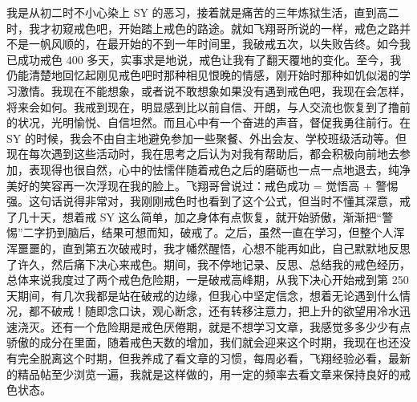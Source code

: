 \begin{case}
    我是从初二时不小心染上 SY 的恶习，接着就是痛苦的三年炼狱生活，直到高二时，我才初窥戒色吧，开始踏上戒色的路途。就如飞翔哥所说的一样，戒色之路并不是一帆风顺的，在最开始的不到一年时间里，我破戒五次，以失败告终。如今我已成功戒色 400 多天，实事求是地说，戒色让我有了翻天覆地的变化。至今，我仍能清楚地回忆起刚见戒色吧时那种相见恨晚的情感，刚开始时那种如饥似渴的学习激情。我现在不能想象，或者说不敢想象如果没有遇到戒色吧，我现在会怎样，将来会如何。我戒到现在，明显感到比以前自信、开朗，与人交流也恢复到了撸前的状况，光明愉悦、自信坦然。而且心中有一个奋进的声音，督促我勇往前行。在 SY 的时候，我会不由自主地避免参加一些聚餐、外出会友、学校班级活动等。但现在每次遇到这些活动时，我在思考之后认为对我有帮助后，都会积极向前地去参加，表现得也很自然，心中的怯懦伴随着戒色之后的磨砺也一点一点地退去，纯净美好的笑容再一次浮现在我的脸上。飞翔哥曾说过：戒色成功 = 觉悟高 + 警惕强。这句话说得非常对，我刚刚戒色时也看到了这个公式，但当时不懂其深意，戒了几十天，想着戒 SY 这么简单，加之身体有点恢复，就开始骄傲，渐渐把“警惕”二字扔到脑后，结果可想而知，破戒了。之后，虽然一直在学习，但整个人浑浑噩噩的，直到第五次破戒时，我才幡然醒悟，心想不能再如此，自己默默地反思了许久，然后痛下决心来戒色。期间，我不停地记录、反思、总结我的戒色经历，总体来说我度过了两个戒色危险期，一是破戒高峰期，从我下决心开始戒到第 250 天期间，有几次我都是站在破戒的边缘，但我心中坚定信念，想着无论遇到什么情况，都不破戒！随即念口诀，观心断念，还有转移注意力，把上升的欲望用冷水迅速浇灭。还有一个危险期是戒色厌倦期，就是不想学习文章，我感觉多多少少有点骄傲的成分在里面，随着戒色天数的增加，我们就会迎来这个时期，我现在也还没有完全脱离这个时期，但我养成了看文章的习惯，每周必看，飞翔经验必看，最新的精品帖至少浏览一遍，我就是这样做的，用一定的频率去看文章来保持良好的戒色状态。

\end{case}
